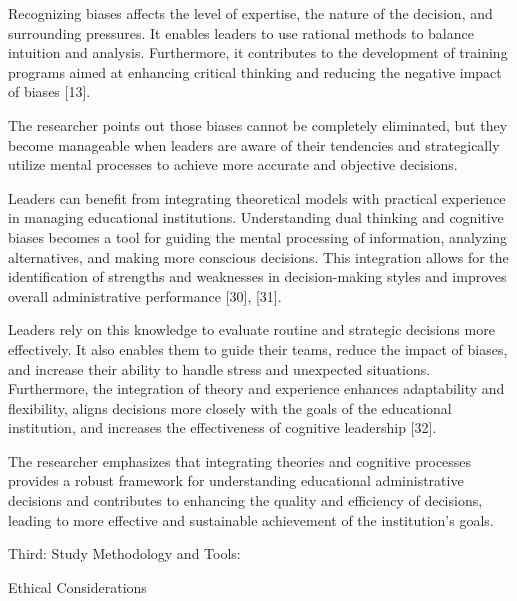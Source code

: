 \documentclass[10pt]{NSP1}
\begin{document}
Recognizing biases affects the level of expertise, the nature of the decision, and surrounding pressures. It enables leaders to use rational methods to balance intuition and analysis. Furthermore, it contributes to the development of training programs aimed at enhancing critical thinking and reducing the negative impact of biases [13].

The researcher points out those biases cannot be completely eliminated, but they become manageable when leaders are aware of their tendencies and strategically utilize mental processes to achieve more accurate and objective decisions.

\par\medskip{}\smallskip

Leaders can benefit from integrating theoretical models with practical experience in managing educational institutions. Understanding dual thinking and cognitive biases becomes a tool for guiding the mental processing of information, analyzing alternatives, and making more conscious decisions. This integration allows for the identification of strengths and weaknesses in decision-making styles and improves overall administrative performance [30], [31].

Leaders rely on this knowledge to evaluate routine and strategic decisions more effectively. It also enables them to guide their teams, reduce the impact of biases, and increase their ability to handle stress and unexpected situations. Furthermore, the integration of theory and experience enhances adaptability and flexibility, aligns decisions more closely with the goals of the educational institution, and increases the effectiveness of cognitive leadership [32].

The researcher emphasizes that integrating theories and cognitive processes provides a robust framework for understanding educational administrative decisions and contributes to enhancing the quality and efficiency of decisions, leading to more effective and sustainable achievement of the institution's goals.

Third: Study Methodology and Tools:

\par\medskip{}\smallskip

Ethical Considerations
\end{document}
